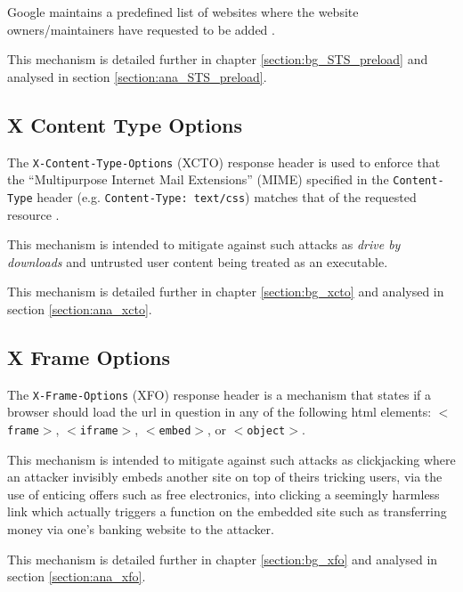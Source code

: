 \documentclass{mscreport}
\begin{document}
\vspace{0.3cm} \noindent
Google maintains a predefined list of websites where the website owners/maintainers have requested to be added \cite{Hodges2012-pe}.

\vspace{0.3cm} \noindent
This mechanism is detailed further in chapter \ref{section:bg_STS_preload} and analysed in section \ref{section:ana_STS_preload}.


\subsection{X Content Type Options}
The \texttt{X-Content-Type-Options} (XCTO) response header is used to enforce that the ``Multipurpose Internet Mail Extensions'' (MIME) specified in the \texttt{Content-Type} header (e.g. \newline 
\texttt{Content-Type: text/css}) matches that of the requested resource \cite{Apple_undated-hz}.

\vspace{0.3cm} \noindent
This mechanism is intended to mitigate against such attacks as \textit{drive by downloads} and untrusted user content being treated as an executable.

\vspace{0.3cm} \noindent
This mechanism is detailed further in chapter \ref{section:bg_xcto} and analysed in section \ref{section:ana_xcto}.


\subsection{X Frame Options}
The \texttt{X-Frame-Options} (XFO) response header is a mechanism that states if a browser should load the url in question in any of the following html elements: \texttt{$<$frame$>$}, \texttt{$<$iframe$>$}, \texttt{$<$embed$>$}, or \texttt{$<$object$>$}.

\vspace{0.3cm} \noindent
This mechanism is intended to mitigate against such attacks as clickjacking where an attacker invisibly embeds another site on top of theirs tricking users, via the use of enticing offers such as free electronics, into clicking a seemingly harmless link which actually triggers a function on the embedded site such as transferring money via one's banking website to the attacker.

\vspace{0.3cm} \noindent
This mechanism is detailed further in chapter \ref{section:bg_xfo} and analysed in section \ref{section:ana_xfo}.
\end{document}
